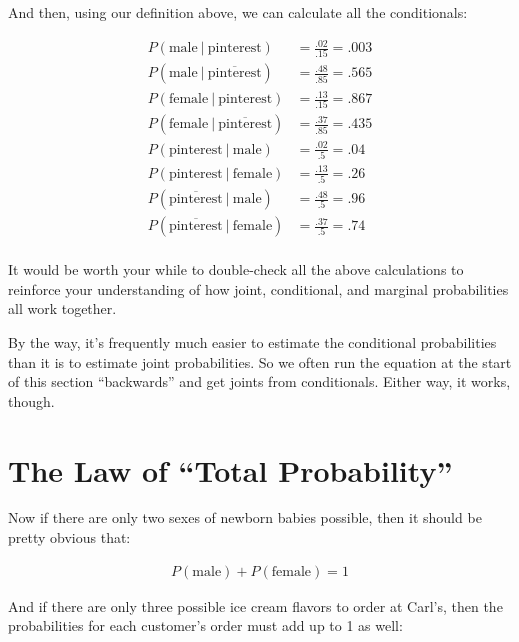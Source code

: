 And then, using our definition above, we can calculate all the conditionals:

\begin{align*}
P(\textrm{male}\ |\ \textrm{pinterest}) &= \frac{.02}{.15} = .003 \\
P(\textrm{male}\ |\ \overline{\textrm{pinterest}}) &= \frac{.48}{.85} = .565 \\
P(\textrm{female}\ |\ \textrm{pinterest}) &= \frac{.13}{.15} = .867 \\
P(\textrm{female}\ |\ \overline{\textrm{pinterest}}) &= \frac{.37}{.85} = .435 \\
P(\textrm{pinterest}\ |\ \textrm{male}) &= \frac{.02}{.5} = .04 \\
P(\textrm{pinterest}\ |\ \textrm{female}) &= \frac{.13}{.5} = .26 \\
P(\overline{\textrm{pinterest}}\ |\ \textrm{male}) &= \frac{.48}{.5} = .96 \\
P(\overline{\textrm{pinterest}}\ |\ \textrm{female}) &= \frac{.37}{.5} = .74 \\
\end{align*}

It would be worth your while to double-check all the above calculations to
reinforce your understanding of how joint, conditional, and marginal
probabilities all work together.

By the way, it's frequently much easier to estimate the conditional
probabilities than it is to estimate joint probabilities. So we often run the
equation at the start of this section ``backwards'' and get joints from
conditionals. Either way, it works, though.

\section{The Law of ``Total Probability''}

Now if there are only two sexes of newborn babies possible, then it should be
pretty obvious that:

\vspace{-.2in}
\begin{align*}
P(\textrm{male}) + P(\textrm{female}) = 1
\end{align*}
\vspace{-.2in}


And if there are only three possible ice cream flavors to order at Carl's, then
the probabilities for each customer's order must add up to 1 as well:

